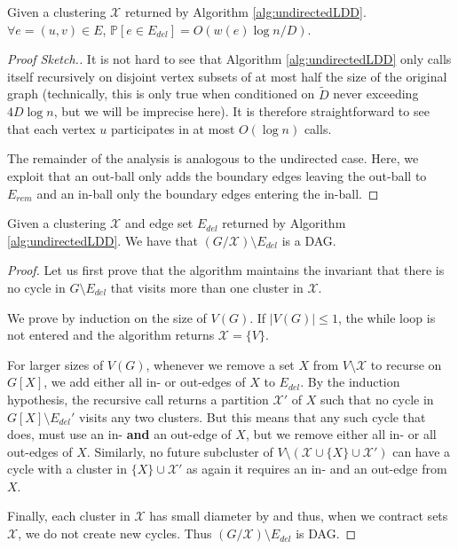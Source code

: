 \begin{claim}
Given a clustering $\mathcal{X}$ returned by Algorithm \ref{alg:undirectedLDD}. $\forall e = (u,v) \in E$, $\mathbb{P}[e \in E_{del}] = O(w(e) \log n / D)$.
\end{claim}
\begin{proof}[Proof Sketch.]
It is not hard to see that  Algorithm \ref{alg:undirectedLDD} only calls itself recursively on disjoint vertex subsets of at most half the size of the original graph (technically, this is only true when conditioned on $\tilde{D}$ never exceeding $4D \log n$, but we will be imprecise here). It is therefore straightforward to see that each vertex $u$ participates in at most $O(\log n)$ calls. 

The remainder of the analysis is analogous to the undirected case. Here, we exploit that an out-ball only adds the boundary edges leaving the out-ball to $E_{rem}$ and an in-ball only the boundary edges entering the in-ball. 
\end{proof}


\begin{claim}
Given a clustering $\mathcal{X}$ and edge set $E_{del}$ returned by Algorithm \ref{alg:undirectedLDD}. We have that $(G / \mathcal{X}) \setminus E_{del}$ is a DAG.
\end{claim}
\begin{proof}
Let us first prove that the algorithm maintains the invariant that there is no cycle in $G \setminus E_{del}$ that visits more than one cluster in $\mathcal{X}$. 

We prove by induction on the size of $V(G)$. If $|V(G)| \leq 1$, the while loop is not entered and the algorithm returns $\mathcal{X} = \{V\}$. 

For larger sizes of $V(G)$, whenever we remove a set $X$ from $V \setminus \mathcal{X}$ to recurse on $G[X]$, we add either all in- or out-edges of $X$ to $E_{del}$. By the induction hypothesis, the recursive call returns a partition $\mathcal{X}'$ of $X$ such that no cycle in $G[X] \setminus E_{del}'$ visits any two clusters. But this means that any such cycle that does, must use an in- \textbf{and} an out-edge of $X$, but we remove either all in- or all out-edges of $X$. Similarly, no future subcluster of $V \setminus (\mathcal{X} \cup \{X\} \cup \mathcal{X}')$ can have a cycle with a cluster in $\{X\} \cup \mathcal{X}'$ as again it requires an in- and an out-edge from $X$.

Finally, each cluster in $\mathcal{X}$ has small diameter by  and thus, when we contract sets $\mathcal{X}$, we do not create new cycles. Thus $(G / \mathcal{X}) \setminus E_{del}$ is DAG.
\end{proof}

